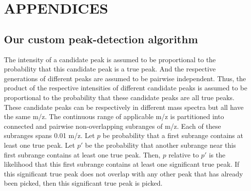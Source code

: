 
\appendix

\chapter*{APPENDICES}

\section*{Our custom peak-detection algorithm}

The intensity of a candidate peak is assumed to be proportional to the probability that this candidate peak is a true peak.
And the respective generations of different peaks are assumed to be pairwise independent.
Thus, the product of the respective intensities of different candidate peaks is assumed to be proportional to the probability that these candidate peaks are all true peaks.
These candidate peaks can be respectively in different mass spectra but all have the same \gls{m/z}.		
The continuous range of applicable \gls{m/z} is partitioned into connected and pairwise non-overlapping subranges of \gls{m/z}. 
Each of these subranges spans 0.01 \gls{m/z}.
Let \(p\) be probability that a first subrange contains at least one true peak.
Let \(p'\) be the probability that another subrange near this first subrange contains at least one true peak.
Then, \(p\) relative to \(p'\) is the likelihood that this first subrange contains at least one significant true peak.
If this significant true peak does not overlap with any other peak that has already been picked, then this significant true peak is picked.
		
